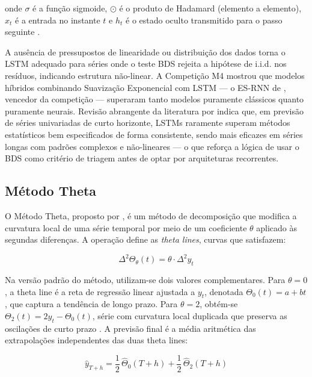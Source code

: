 \documentclass[
  12pt,
  openright,
  twoside,
  a4paper,
  english,
  brazil
]{abntex2}
\begin{document}
onde $\sigma$ é a função sigmoide, $\odot$ é o produto de Hadamard (elemento a elemento), $x_t$ é a entrada no instante $t$ e $h_t$ é o estado oculto transmitido para o passo seguinte \cite{hochreiter1997long}.

A ausência de pressupostos de linearidade ou distribuição dos dados torna o LSTM adequado para séries onde o teste BDS rejeita a hipótese de i.i.d. nos resíduos, indicando estrutura não-linear. A Competição M4 mostrou que modelos híbridos combinando Suavização Exponencial com LSTM — o ES-RNN de , vencedor da competição — superaram tanto modelos puramente clássicos quanto puramente neurais. Revisão abrangente da literatura por  indica que, em previsão de séries univariadas de curto horizonte, LSTMs raramente superam métodos estatísticos bem especificados de forma consistente, sendo mais eficazes em séries longas com padrões complexos e não-lineares — o que reforça a lógica de usar o BDS como critério de triagem antes de optar por arquiteturas recorrentes.

\subsection{Método Theta}
\label{subsec:theta}

O Método Theta, proposto por , é um método de decomposição que modifica a curvatura local de uma série temporal por meio de um coeficiente $\theta$ aplicado às segundas diferenças. A operação define as \textit{theta lines}, curvas que satisfazem:

\begin{equation}
  \Delta^2 \Theta_\theta(t) = \theta \cdot \Delta^2 y_t
  \label{eq:theta-def}
\end{equation}

Na versão padrão do método, utilizam-se dois valores complementares. Para $\theta = 0$, a theta line é a reta de regressão linear ajustada a $y_t$, denotada $\Theta_0(t) = a + bt$, que captura a tendência de longo prazo. Para $\theta = 2$, obtém-se $\Theta_2(t) = 2y_t - \Theta_0(t)$, série com curvatura local duplicada que preserva as oscilações de curto prazo \cite{assimakopoulos2000theta}. A previsão final é a média aritmética das extrapolações independentes das duas theta lines:

\begin{equation}
  \hat{y}_{T+h} = \frac{1}{2}\,\hat{\Theta}_0(T+h) + \frac{1}{2}\,\hat{\Theta}_2(T+h)
  \label{eq:theta-forecast}
\end{equation}
\end{document}
